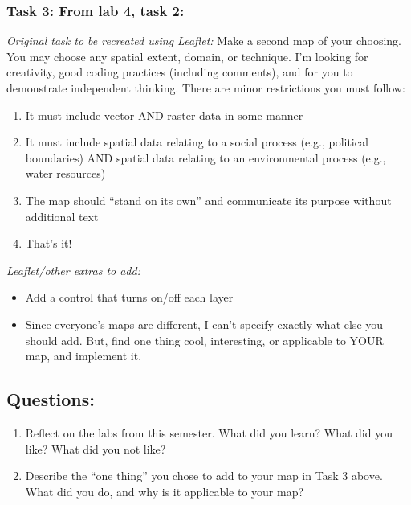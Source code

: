 \documentclass[]{article}
\begin{document}
\hypertarget{task-3-from-lab-4-task-2}{%
\subsubsection{Task 3: From lab 4, task
2:}\label{task-3-from-lab-4-task-2}}

\emph{Original task to be recreated using Leaflet:} Make a second map of
your choosing. You may choose any spatial extent, domain, or technique.
I'm looking for creativity, good coding practices (including comments),
and for you to demonstrate independent thinking. There are minor
restrictions you must follow:

\begin{enumerate}
\def\labelenumi{\arabic{enumi}.}
\item
  It must include vector AND raster data in some manner
\item
  It must include spatial data relating to a social process (e.g.,
  political boundaries) AND spatial data relating to an environmental
  process (e.g., water resources)
\item
  The map should ``stand on its own'' and communicate its purpose
  without additional text
\item
  That's it!
\end{enumerate}

\emph{Leaflet/other extras to add:}

\begin{itemize}
\item
  Add a control that turns on/off each layer
\item
  Since everyone's maps are different, I can't specify exactly what else
  you should add. But, find one thing cool, interesting, or applicable
  to YOUR map, and implement it.
\end{itemize}

\hypertarget{questions}{%
\subsection{\texorpdfstring{\textbf{Questions:}}{Questions:}}\label{questions}}

\begin{enumerate}
\def\labelenumi{\arabic{enumi}.}
\item
  Reflect on the labs from this semester. What did you learn? What did
  you like? What did you not like?
\item
  Describe the ``one thing'' you chose to add to your map in Task 3
  above. What did you do, and why is it applicable to your map?
\end{enumerate}
\end{document}
